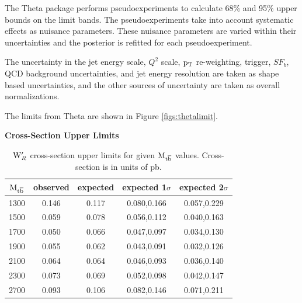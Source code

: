 The Theta package performs pseudoexperiments to calculate 68\% and 95\% upper bounds on the limit bands.  
The pseudoexperiments take into account systematic effects as nuisance parameters.  These nuisance parameters 
are varied within their uncertainties and the posterior is refitted for each pseudoexperiment.  

The uncertainty in the jet energy scale, $Q^2$ scale, $\mathrm{p_{T}}$ re-weighting, trigger, $SF_b$, QCD background uncertainties, and jet energy resolution are taken 
as shape based uncertainties, and the other sources of uncertainty are taken as overall normalizations.  

The limits from Theta are shown in Figure \ref{figs:thetalimit}.

\begin{table}
\begin{center}
\bf{Cross-Section Upper Limits}\\
\begin{tabular}{c||c|c|c|c}
\hline
\hline
\bf{$\mathrm{M_{{t\overline{b}}}}$} & \bf{observed}  & \bf{expected} & \bf{expected 1$\sigma$}  & \bf{expected 2$\sigma$} \\
\hline
\hline
1300 & 0.146 & 0.117 & 0.080,0.166 & 0.057,0.229\\
\hline
1500 & 0.059 & 0.078 & 0.056,0.112 & 0.040,0.163\\
\hline
1700 & 0.050 & 0.066 & 0.047,0.097 & 0.034,0.130\\
\hline
1900 & 0.055 & 0.062 & 0.043,0.091 & 0.032,0.126\\
\hline
2100 & 0.064 & 0.064 & 0.046,0.093 & 0.036,0.140\\
\hline
2300 & 0.073 & 0.069 & 0.052,0.098 & 0.042,0.147\\
\hline
2700 & 0.093 & 0.106 & 0.082,0.146 & 0.071,0.211\\
\hline
\end{tabular}
\end{center}
\caption{$\mathrm{W}^\prime_R$ cross-section upper limits for given $\mathrm{M_{{t\overline{b}}}}$ values.  Cross-section is in units of pb.}
\label{table:upperxsec}
\end{table}


